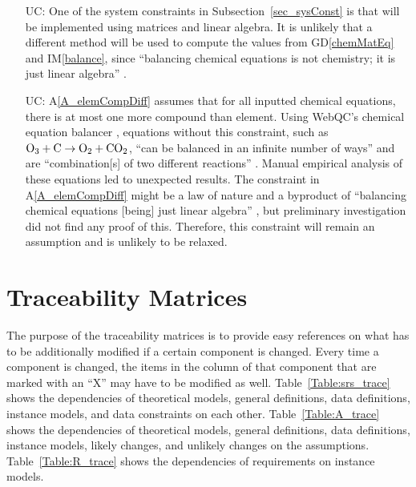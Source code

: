 \documentclass[12pt]{article}
\newcommand{\gdref}[1]{GD\ref{#1}}
\newcommand{\aref}[1]{A\ref{#1}}
\newcommand{\iref}[1]{IM\ref{#1}}
\newcounter{ucnum} %
\begin{document}
\begin{itemize}

  \item[UC\refstepcounter{ucnum}\theucnum\label{UC_diffSolveMethod}:] One of
    the system constraints in Subsection~\ref{sec_sysConst} is that \progname{}
    will be implemented using matrices and linear algebra. It is unlikely that
    a different method will be used to compute the values from \gdref{chemMatEq}
    and \iref{balance}, since ``balancing chemical equations is not chemistry;
    it is just linear algebra'' \cite[p. 193]{risteski_new_2021}.

  \item[UC\refstepcounter{ucnum}\theucnum\label{UC_allEqsPermitted}:]
    \aref{A_elemCompDiff} assumes that for all inputted chemical equations,
    there is at most one more compound than element. Using WebQC's chemical
    equation balancer \cite{noauthor_balance_2023}, equations without this
    constraint, such as $\ce{O3} + \ce{C} \rightarrow \ce{O2} + \ce{CO2}$,
    ``can be balanced in an infinite number of ways'' and are
    ``combination[s] of two different reactions'' \cite{noauthor_balance_2023}.
    Manual empirical analysis of these equations led to unexpected results.
    The constraint in \aref{A_elemCompDiff} might be a law of nature and a
    byproduct of ``balancing chemical equations [being] just linear algebra''
    \cite[p. 193]{risteski_new_2021}, but preliminary investigation did not
    find any proof of this. Therefore, this constraint will remain an
    assumption and is unlikely to be relaxed.

\end{itemize}

\section{Traceability Matrices } \label{sec_traceMats}

The purpose of the traceability matrices is to provide easy references on what
has to be additionally modified if a certain component is changed.  Every time a
component is changed, the items in the column of that component that are marked
with an ``X'' may have to be modified as well. Table~\ref{Table:srs_trace} shows
the dependencies of theoretical models, general definitions, data definitions,
instance models, and data constraints on each other. Table~\ref{Table:A_trace}
shows the dependencies of theoretical models,
general definitions, data definitions, instance models, likely changes, and
unlikely changes on the assumptions. Table~\ref{Table:R_trace}
shows the dependencies of requirements on instance models.
\end{document}
